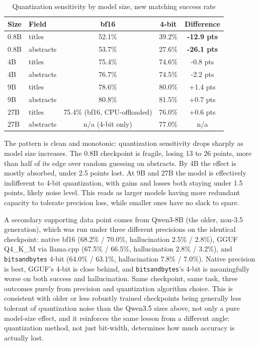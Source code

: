 \begin{table}[h]
\centering
\caption{Quantization sensitivity by model size, new matching success rate}
\label{tab:quant-sensitivity}
\begin{tabular}{llccc}
\toprule
Size & Field & bf16 & 4-bit & Difference \\
\midrule
0.8B & titles & 52.1\% & 39.2\% & \textbf{-12.9 pts} \\
0.8B & abstracts & 53.7\% & 27.6\% & \textbf{-26.1 pts} \\
4B & titles & 75.4\% & 74.6\% & -0.8 pts \\
4B & abstracts & 76.7\% & 74.5\% & -2.2 pts \\
9B & titles & 78.6\% & 80.0\% & +1.4 pts \\
9B & abstracts & 80.8\% & 81.5\% & +0.7 pts \\
27B & titles & 75.4\% (bf16, CPU-offloaded) & 76.0\% & +0.6 pts \\
27B & abstracts & n/a (4-bit only) & 77.0\% & n/a \\
\bottomrule
\end{tabular}
\end{table}

The pattern is clean and monotonic: quantization sensitivity drops sharply as model size increases. The 0.8B checkpoint is fragile, losing 13 to 26 points, more than half of its edge over random guessing on abstracts. By 4B the effect is mostly absorbed, under 2.5 points lost. At 9B and 27B the model is effectively indifferent to 4-bit quantization, with gains and losses both staying under 1.5 points, likely noise level. This reads as larger models having more redundant capacity to tolerate precision loss, while smaller ones have no slack to spare.

A secondary supporting data point comes from Qwen3-8B (the older, non-3.5 generation), which was run under three different precisions on the identical checkpoint: native bf16 (68.2\% / 70.0\%, hallucination 2.5\% / 2.8\%), GGUF Q4\_K\_M via llama.cpp (67.5\% / 66.5\%, hallucination 2.8\% / 3.2\%), and \texttt{bitsandbytes} 4-bit (64.0\% / 63.1\%, hallucination 7.8\% / 7.0\%). Native precision is best, GGUF's 4-bit is close behind, and \texttt{bitsandbytes}'s 4-bit is meaningfully worse on both success and hallucination. Same checkpoint, same task, three outcomes purely from precision and quantization algorithm choice. This is consistent with older or less robustly trained checkpoints being generally less tolerant of quantization noise than the Qwen3.5 sizes above, not only a pure model-size effect, and it reinforces the same lesson from a different angle: quantization method, not just bit-width, determines how much accuracy is actually lost.


